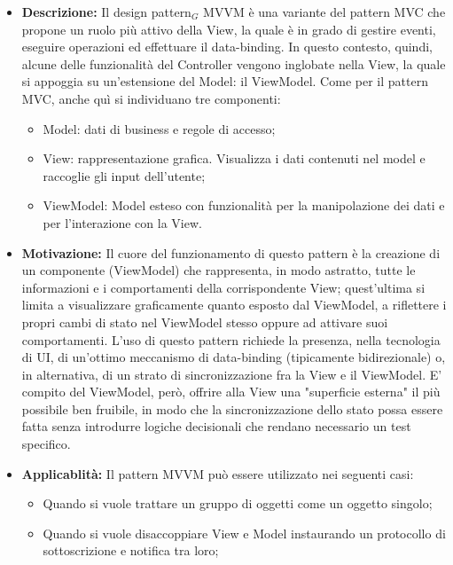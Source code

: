 \begin{itemize}
\item \textbf{Descrizione:} Il design pattern$_G$ MVVM è una variante del pattern MVC che propone un ruolo più attivo della View, la quale è in grado di gestire eventi, eseguire operazioni ed effettuare il data-binding. In questo contesto, quindi, alcune delle funzionalità del Controller vengono inglobate nella View, la quale si appoggia su un’estensione del Model: il ViewModel. Come per il pattern MVC, anche quì si individuano tre componenti:

\begin{itemize}
\item Model: dati di business e regole di accesso;
\item View: rappresentazione grafica. Visualizza i dati contenuti nel model e raccoglie gli input dell’utente;
\item ViewModel: Model esteso con funzionalità per la manipolazione dei dati e per l’interazione con la View.
\end{itemize}

\item \textbf{Motivazione:}  Il cuore del funzionamento di questo pattern è la creazione di un componente (ViewModel) che rappresenta, in modo astratto, tutte le informazioni e i comportamenti della corrispondente View; quest'ultima si limita a visualizzare graficamente quanto esposto dal ViewModel, a riflettere i propri cambi di stato nel ViewModel stesso oppure ad attivare suoi comportamenti. 
L'uso di questo pattern richiede la presenza, nella tecnologia di UI, di un'ottimo meccanismo di data-binding (tipicamente bidirezionale) o, in alternativa, di un strato di sincronizzazione fra la View e il ViewModel.
E' compito del ViewModel, però, offrire alla View una "superficie esterna" il più possibile ben fruibile, in modo che la sincronizzazione dello stato possa essere fatta senza introdurre logiche decisionali che rendano necessario un test specifico.

\item \textbf{Applicablità:} Il pattern MVVM può essere utilizzato nei seguenti casi:

\begin{itemize}
\item Quando si vuole trattare un gruppo di oggetti come un oggetto singolo;
\item Quando si vuole disaccoppiare View e Model instaurando un protocollo di sottoscrizione e notifica tra loro;
\end{itemize}

\end{itemize}

